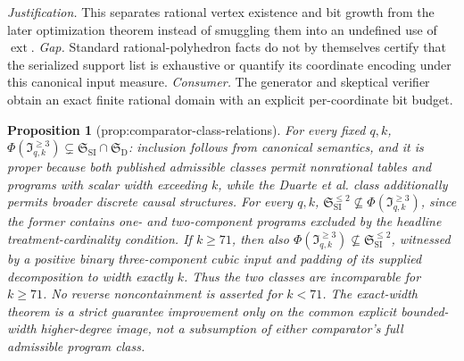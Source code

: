 \documentclass{article}
\newtheorem{proposition}{Proposition}
\begin{document}
\par\smallskip\noindent \textit{Justification.} This separates rational vertex existence and bit growth from the later optimization theorem instead of smuggling them into an undefined use of \(\operatorname{ext}\). \textit{Gap.} Standard rational-polyhedron facts do not by themselves certify that the serialized support list is exhaustive or quantify its coordinate encoding under this canonical input measure. \textit{Consumer.} The generator and skeptical verifier obtain an exact finite rational domain with an explicit per-coordinate bit budget.

\begin{proposition}[prop:comparator-class-relations]\label{prop:comparator-class-relations}
For every fixed \(q,k\), \(\Phi(\mathfrak I_{q,k}^{\ge3})\subsetneq\mathfrak S_{\mathrm{SI}}\cap\mathfrak S_{\mathrm{D}}\): inclusion follows from canonical semantics, and it is proper because both published admissible classes permit nonrational tables and programs with scalar width exceeding \(k\), while the Duarte et al. class additionally permits broader discrete causal structures.  For every \(q,k\), \(\mathfrak S_{\mathrm{SI}}^{\le2}\not\subseteq\Phi(\mathfrak I_{q,k}^{\ge3})\), since the former contains one- and two-component programs excluded by the headline treatment-cardinality condition.  If \(k\ge71\), then also \(\Phi(\mathfrak I_{q,k}^{\ge3})\not\subseteq\mathfrak S_{\mathrm{SI}}^{\le2}\), witnessed by a positive binary three-component cubic input and padding of its supplied decomposition to width exactly \(k\).  Thus the two classes are incomparable for \(k\ge71\).  No reverse noncontainment is asserted for \(k<71\).  The exact-width theorem is a strict guarantee improvement only on the common explicit bounded-width higher-degree image, not a subsumption of either comparator's full admissible program class.
\end{proposition}
\end{document}
